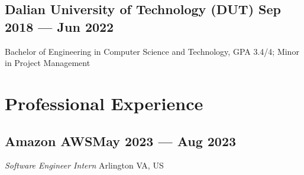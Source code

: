 \documentclass[a4,12pt]{article}
\newcommand{\subtext}[1]{
#1\par\vspace{-0.3cm}}
\newenvironment{zitemize}{
\begin{itemize}\itemsep0pt \parskip0pt \parsep1pt}
{\end{itemize}\vspace{-0.5cm}}
\begin{document}
\vspace{-0.4cm}
\subsection*{Dalian University of Technology (DUT) \hfill \textbf{Sep 2018 --- Jun 2022}}
Bachelor of Engineering in Computer Science and Technology, GPA 3.4/4; Minor in Project Management




\vspace{-0.5cm}


\section{\textbf{Professional Experience}}
        
\vspace{-0.15cm}


\subsection*{\normalsize\textbf{Amazon AWS}\hfill May 2023 --- Aug 2023} 
\subtext{\textit{Software Engineer Intern} \hfill Arlington VA, US} 

\vspace{-0.1cm}

\end{document}
